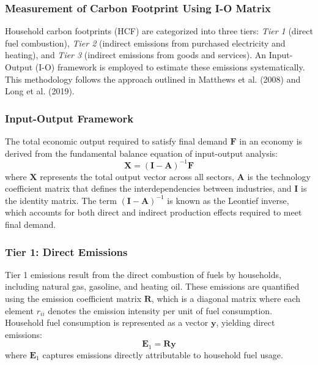\documentclass[12pt,a4paper]{article}%
\begin{document}
\subsubsection*{Measurement of Carbon Footprint Using I-O Matrix}

Household carbon footprints (HCF) are categorized into three tiers: \textit{Tier 1} (direct fuel combustion), \textit{Tier 2} (indirect emissions from purchased electricity and heating), and \textit{Tier 3} (indirect emissions from goods and services). An Input-Output (I-O) framework is employed to estimate these emissions systematically. This methodology follows the approach outlined in Matthews et al. (2008) and Long et al. (2019).

\subsubsection*{Input-Output Framework}
The total economic output required to satisfy final demand \( \mathbf{F} \) in an economy is derived from the fundamental balance equation of input-output analysis:
\begin{equation}
    \mathbf{X} = (\mathbf{I} - \mathbf{A})^{-1} \mathbf{F}
\end{equation}
where \( \mathbf{X} \) represents the total output vector across all sectors, \( \mathbf{A} \) is the technology coefficient matrix that defines the interdependencies between industries, and \( \mathbf{I} \) is the identity matrix. The term \( (\mathbf{I} - \mathbf{A})^{-1} \) is known as the Leontief inverse, which accounts for both direct and indirect production effects required to meet final demand.

\subsubsection*{Tier 1: Direct Emissions}
Tier 1 emissions result from the direct combustion of fuels by households, including natural gas, gasoline, and heating oil. These emissions are quantified using the emission coefficient matrix \( \mathbf{R} \), which is a diagonal matrix where each element \( r_{ii} \) denotes the emission intensity per unit of fuel consumption. Household fuel consumption is represented as a vector \( \mathbf{y} \), yielding direct emissions:
\begin{equation}
    \mathbf{E}_1 = \mathbf{R} \mathbf{y}
\end{equation}
where \( \mathbf{E}_1 \) captures emissions directly attributable to household fuel usage.
\end{document}

